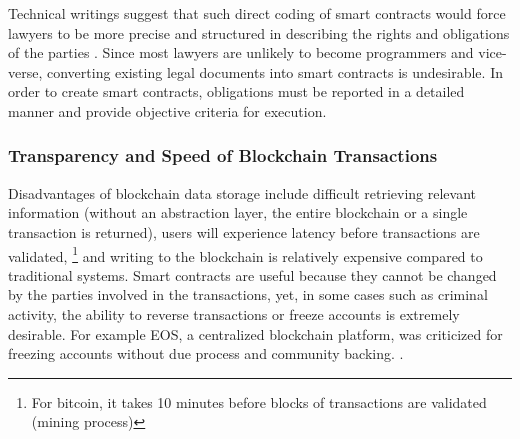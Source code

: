 Technical writings suggest
that such direct coding of smart contracts would force lawyers to be more precise and
structured in describing the rights and obligations of the parties \cite{stepWolf}. Since most lawyers are unlikely to become programmers and vice-verse, converting existing legal documents into smart contracts is undesirable. In order to create smart contracts, obligations must be reported in a  detailed manner and provide objective criteria for execution.


\subsubsection{Transparency and Speed of Blockchain Transactions}

	
Disadvantages of blockchain data storage include difficult retrieving relevant information (without an abstraction layer, the entire blockchain or a single transaction is returned), users will experience latency before transactions are validated, 	\footnote{For bitcoin, it takes 10 minutes before blocks of transactions are validated (mining process)} and writing to the blockchain is relatively expensive compared to traditional systems. Smart contracts are useful because they cannot be changed by the parties involved in the transactions, yet, in some cases such as criminal activity, the ability to reverse transactions or freeze accounts is extremely desirable. For example EOS, a centralized blockchain platform, was criticized for freezing accounts without due process and community backing. \cite{EOS:Online}. %
%
%